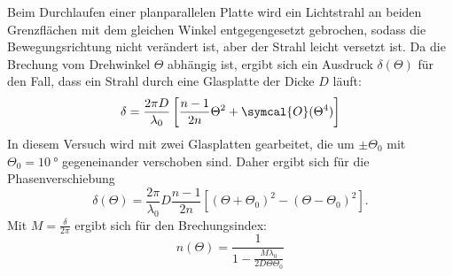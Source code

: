 \noindent Beim Durchlaufen einer planparallelen Platte wird ein Lichtstrahl an beiden Grenzflächen mit dem gleichen Winkel entgegengesetzt gebrochen, sodass die Bewegungsrichtung nicht
verändert ist, aber der Strahl leicht versetzt ist. Da die Brechung vom Drehwinkel $\Theta$ abhängig ist, ergibt sich ein Ausdruck $\delta(\Theta)$ für den Fall, dass ein Strahl durch 
eine Glasplatte der Dicke $D$ läuft:
\begin{equation*}
    \delta = \frac{2 \pi D}{\lambda_0} \left[ \frac{n-1}{2n} \Theta^2 + \symcal{O}(\Theta ^4)\right]
\end{equation*}
In diesem Versuch wird mit zwei Glasplatten gearbeitet, die um $ \pm \Theta_0$ mit $\Theta_0 = \SI{10}{\degree}$ gegeneinander verschoben sind. Daher ergibt 
sich für die Phasenverschiebung 
\begin{equation*}
    \delta(\Theta) = \frac{2 \pi}{\lambda_0} D \frac{n-1}{2n} \left[ (\Theta + \Theta_0)^2 - (\Theta - \Theta_0)^2 \right]. 
\end{equation*}
Mit $ M = \frac{\delta}{2 \pi} $ ergibt sich für den Brechungsindex:
\begin{equation}
    n(\Theta) = \frac{1}{1 - \frac{M \lambda_0}{2 D \Theta \Theta_0}}
\end{equation}